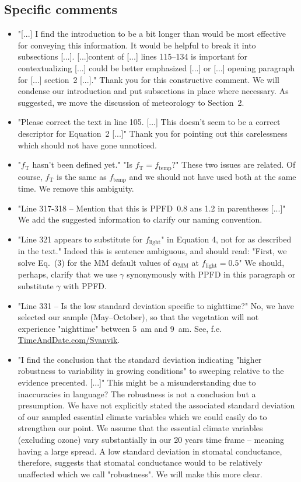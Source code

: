 \documentclass{scrartcl}
\begin{document}
\subsection*{Specific comments}
\begin{itemize}
    
    \item {\color{blue} "[...] I find the introduction to be a bit longer than would be most effective for conveying this information. It would be helpful to break it into subsections [...]. [...]content of [...] lines 115--134 is important for contextualizing [...] could be better emphasized [...] or [...] opening paragraph for [...] section~2 [...]."} Thank you for this constructive comment. We will condense our introduction and put subsections in place where necessary. As suggested, we move the discussion of meteorology to Section~2.
    \item {\color{blue} "Please correct the text in line 105. [...] This doesn't seem to be a correct descriptor for Equation~2 [...]"} Thank you for pointing out this carelessness which should not have gone unnoticed.
    \item {\color{blue} "$f_\mathrm{T}$ hasn't been defined yet." "Is $f_\mathrm{T} = f_\mathrm{temp}$?"} These two issues are related. Of course, $f_\mathrm{T}$ is the same as $f_\mathrm{temp}$ and we should not have used both at the same time. We remove this ambiguity.
    \item {\color{blue} "Line 317-318 -- Mention that this is PPFD~0.8 ans 1.2 in parentheses [...]"} We add the suggested information to clarify our naming convention.
    \item {\color{blue} "Line 321 appears to substitute for $f_\mathrm{light}$" in Equation 4, not for as described in the text."} Indeed this is sentence ambiguous, and should read: "First, we solve Eq.~(3) for the MM default values of $\alpha_\mathrm{MM}$ at $f_\mathrm{light}=0.5$" We should, perhaps, clarify that we use $\gamma$ synonymously with PPFD in this paragraph or substitute $\gamma$ with PPFD.
    \item {\color{blue} "Line 331 -- Is the low standard deviation specific to nighttime?"} No, we have selected our sample (May--October), so that the vegetation will not experience "nighttime" between 5~am and 9~am. See, f.e. \href{https://www.timeanddate.com/sun/@777232}{TimeAndDate.com/Svanvik}.
    \item {\color{blue} "I find the conclusion that the standard deviation indicating "higher robustness to variability in growing conditions" to sweeping relative to the evidence precented. [...]"} This might be a misunderstanding due to inaccuracies in language? The robustness is not a conclusion but a presumption. We have not explicitly stated the associated standard deviation of our sampled essential climate variables which we could easily do to strengthen our point. We assume that the essential climate variables (excluding ozone) vary substantially in our 20 years time frame -- meaning having a large spread. A low standard deviation in stomatal conductance, therefore, suggests that stomatal conductance would to be relatively unaffected which we call "robustness". We will make this more clear.

\end{itemize}
\end{document}
